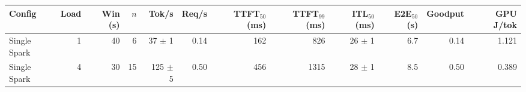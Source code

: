 \begin{tabular}{l r r r r r r r r r r r}
\toprule
Config & Load & Win (s) & $n$ & Tok/s & Req/s & TTFT$_{50}$ (ms) & TTFT$_{99}$ (ms) & ITL$_{50}$ (ms) & E2E$_{50}$ (s) & Goodput & GPU J/tok \\
\midrule
Single Spark & 1 & 40 & 6\rlap{$^\dagger$} & 37 $\pm$ 1 & 0.14 & 162 & 826 & 26 $\pm$ 1 & 6.7 & 0.14 & 1.121 \\
Single Spark & 4 & 30 & 15\rlap{$^\dagger$} & 125 $\pm$ 5 & 0.50 & 456 & 1315 & 28 $\pm$ 1 & 8.5 & 0.50 & 0.389 \\
\bottomrule
\end{tabular}
